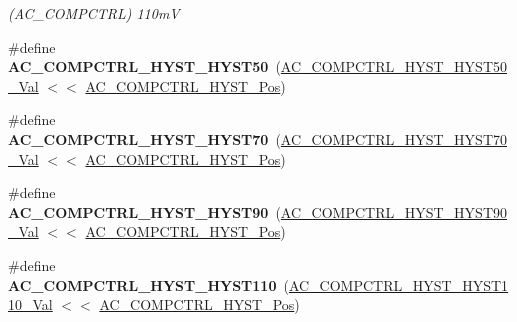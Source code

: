 \begin{DoxyCompactItemize}
\begin{DoxyCompactList}\small\item\em (A\+C\+\_\+\+C\+O\+M\+P\+C\+T\+R\+L) 110m\+V \end{DoxyCompactList}\item 
\hypertarget{group___s_a_m_l21___a_c_gac1e0c0dbbcf03b3e634553e352ecbee1}{}\#define {\bfseries A\+C\+\_\+\+C\+O\+M\+P\+C\+T\+R\+L\+\_\+\+H\+Y\+S\+T\+\_\+\+H\+Y\+S\+T50}~(\hyperlink{group___s_a_m_l21___a_c_gad32217a0763207fb52502050a20cc73a}{A\+C\+\_\+\+C\+O\+M\+P\+C\+T\+R\+L\+\_\+\+H\+Y\+S\+T\+\_\+\+H\+Y\+S\+T50\+\_\+\+Val}   $<$$<$ \hyperlink{group___s_a_m_l21___a_c_ga080eedbd8cdba82fc0d24013941b523b}{A\+C\+\_\+\+C\+O\+M\+P\+C\+T\+R\+L\+\_\+\+H\+Y\+S\+T\+\_\+\+Pos})\label{group___s_a_m_l21___a_c_gac1e0c0dbbcf03b3e634553e352ecbee1}

\item 
\hypertarget{group___s_a_m_l21___a_c_ga38b9bbce15005c31cd02e5ebd480c212}{}\#define {\bfseries A\+C\+\_\+\+C\+O\+M\+P\+C\+T\+R\+L\+\_\+\+H\+Y\+S\+T\+\_\+\+H\+Y\+S\+T70}~(\hyperlink{group___s_a_m_l21___a_c_ga06c3e12b61178373b3f0f8b1548be100}{A\+C\+\_\+\+C\+O\+M\+P\+C\+T\+R\+L\+\_\+\+H\+Y\+S\+T\+\_\+\+H\+Y\+S\+T70\+\_\+\+Val}   $<$$<$ \hyperlink{group___s_a_m_l21___a_c_ga080eedbd8cdba82fc0d24013941b523b}{A\+C\+\_\+\+C\+O\+M\+P\+C\+T\+R\+L\+\_\+\+H\+Y\+S\+T\+\_\+\+Pos})\label{group___s_a_m_l21___a_c_ga38b9bbce15005c31cd02e5ebd480c212}

\item 
\hypertarget{group___s_a_m_l21___a_c_ga8d20a1617e730db95705f254c8d5f99d}{}\#define {\bfseries A\+C\+\_\+\+C\+O\+M\+P\+C\+T\+R\+L\+\_\+\+H\+Y\+S\+T\+\_\+\+H\+Y\+S\+T90}~(\hyperlink{group___s_a_m_l21___a_c_ga03b4afa21a30a1aa772fa4b81f800f99}{A\+C\+\_\+\+C\+O\+M\+P\+C\+T\+R\+L\+\_\+\+H\+Y\+S\+T\+\_\+\+H\+Y\+S\+T90\+\_\+\+Val}   $<$$<$ \hyperlink{group___s_a_m_l21___a_c_ga080eedbd8cdba82fc0d24013941b523b}{A\+C\+\_\+\+C\+O\+M\+P\+C\+T\+R\+L\+\_\+\+H\+Y\+S\+T\+\_\+\+Pos})\label{group___s_a_m_l21___a_c_ga8d20a1617e730db95705f254c8d5f99d}

\item 
\hypertarget{group___s_a_m_l21___a_c_gab73157f4a81b3910546e35f887ac0dbc}{}\#define {\bfseries A\+C\+\_\+\+C\+O\+M\+P\+C\+T\+R\+L\+\_\+\+H\+Y\+S\+T\+\_\+\+H\+Y\+S\+T110}~(\hyperlink{group___s_a_m_l21___a_c_gaac0bfb99137707c74ec43fa21863594b}{A\+C\+\_\+\+C\+O\+M\+P\+C\+T\+R\+L\+\_\+\+H\+Y\+S\+T\+\_\+\+H\+Y\+S\+T110\+\_\+\+Val}  $<$$<$ \hyperlink{group___s_a_m_l21___a_c_ga080eedbd8cdba82fc0d24013941b523b}{A\+C\+\_\+\+C\+O\+M\+P\+C\+T\+R\+L\+\_\+\+H\+Y\+S\+T\+\_\+\+Pos})\label{group___s_a_m_l21___a_c_gab73157f4a81b3910546e35f887ac0dbc}


\end{DoxyCompactItemize}

